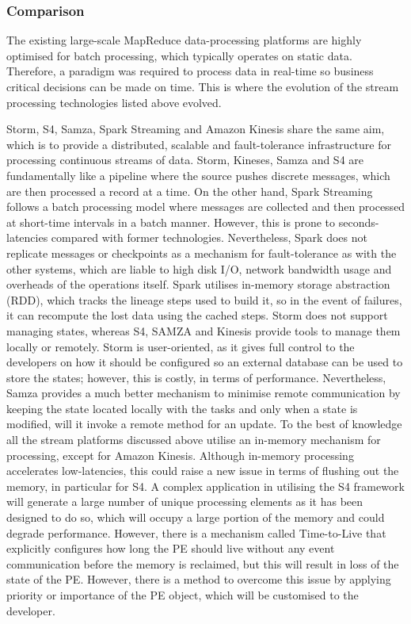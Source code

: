 \subsubsection{Comparison} \label{subsubsec-lr-reallayer-comparison}
The existing large-scale MapReduce data-processing platforms are highly optimised for batch processing, which typically operates on static data. Therefore, a paradigm was required to process data in real-time so business critical decisions can be made on time. This is where the evolution of the stream processing technologies listed above evolved.  

Storm, S4, Samza, Spark Streaming and Amazon Kinesis share the same aim, which is to provide a distributed, scalable and fault-tolerance infrastructure for processing continuous streams of data. Storm, Kineses, Samza and S4 are fundamentally like a pipeline where the source pushes discrete messages, which are then processed a record at a time. On the other hand, Spark Streaming follows a batch processing model where messages are collected and then processed at short-time intervals in a batch manner. However, this is prone to seconds-latencies compared with former technologies. Nevertheless, Spark does not replicate messages or checkpoints as a mechanism for fault-tolerance as with the other systems, which are liable to high disk I/O, network bandwidth usage and overheads of the operations itself. Spark utilises in-memory storage abstraction (RDD), which tracks the lineage steps used to build it, so in the event of failures, it can recompute the lost data using the cached steps. Storm does not support managing states, whereas S4, SAMZA and Kinesis provide tools to manage them locally or remotely. Storm is user-oriented, as it gives full control to the developers on how it should be configured so an external database can be used to store the states; however, this is costly, in terms of performance. Nevertheless, Samza provides a much better mechanism to minimise remote communication by keeping the state located locally with the tasks and only when a state is modified, will it invoke a remote method for an update. To the best of knowledge all the stream platforms discussed above utilise an in-memory mechanism for processing, except for Amazon Kinesis. Although in-memory processing accelerates low-latencies, this could raise a new issue in terms of flushing out the memory, in particular for S4. A complex application in utilising the S4 framework will generate a large number of unique processing elements as it has been designed to do so, which will occupy a large portion of the memory and could degrade performance. However, there is a mechanism called Time-to-Live that explicitly configures how long the PE should live without any event communication before the memory is reclaimed, but this will result in loss of the state of the PE. However, there is a method to overcome this issue by applying priority or importance of the PE object, which will be customised to the developer.

